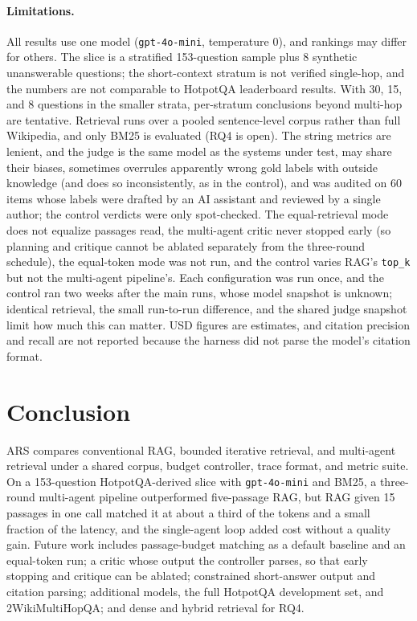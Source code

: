 \documentclass[11pt,a4paper]{article}
\begin{document}
\paragraph{Limitations.}
All results use one model (\texttt{gpt-4o-mini}, temperature 0), and rankings
may differ for others.
The slice is a stratified 153-question sample plus 8 synthetic unanswerable
questions; the short-context stratum is not verified single-hop, and the
numbers are not comparable to HotpotQA leaderboard results.
With 30, 15, and 8 questions in the smaller strata, per-stratum conclusions
beyond multi-hop are tentative.
Retrieval runs over a pooled sentence-level corpus rather than full
Wikipedia, and only BM25 is evaluated (RQ4 is open).
The string metrics are lenient, and the judge is the same model as the
systems under test, may share their biases, sometimes overrules apparently
wrong gold labels with outside knowledge (and does so inconsistently, as in
the control), and was audited on 60 items whose labels were drafted by an AI
assistant and reviewed by a single author; the control verdicts were only
spot-checked.
The equal-retrieval mode does not equalize passages read, the multi-agent
critic never stopped early (so planning and critique cannot be ablated
separately from the three-round schedule), the equal-token mode was not run,
and the control varies RAG's \texttt{top\_k} but not the multi-agent
pipeline's.
Each configuration was run once, and the control ran two weeks after the main
runs, whose model snapshot is unknown; identical retrieval, the small
run-to-run difference, and the shared judge snapshot limit how much this can
matter.
USD figures are estimates, and citation precision and recall are not reported
because the harness did not parse the model's citation format.

\section{Conclusion}
\label{sec:conclusion}

ARS compares conventional RAG, bounded iterative retrieval, and multi-agent
retrieval under a shared corpus, budget controller, trace format, and metric
suite.
On a 153-question HotpotQA-derived slice with \texttt{gpt-4o-mini} and BM25,
a three-round multi-agent pipeline outperformed five-passage RAG, but RAG
given 15 passages in one call matched it at about a third of the tokens and a
small fraction of the latency, and the single-agent loop added cost without a
quality gain.
Future work includes passage-budget matching as a default baseline and an
equal-token run; a critic whose output the controller parses, so that early
stopping and critique can be ablated; constrained short-answer output and
citation parsing; additional models, the full HotpotQA development set, and
2WikiMultiHopQA; and dense and hybrid retrieval for RQ4.
\end{document}
